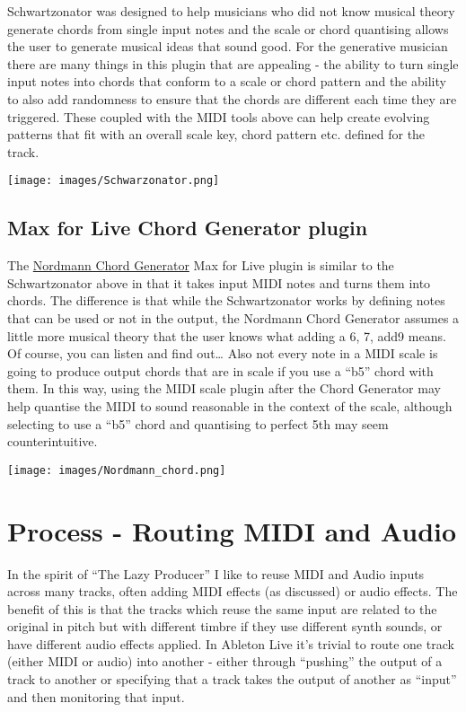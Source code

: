 \documentclass[
  12pt,
  letterpaper,
  oneside,
  open=any]{scrbook}
\begin{document}
Schwartzonator was designed to help musicians who did not know musical
theory generate chords from single input notes and the scale or chord
quantising allows the user to generate musical ideas that sound good.
For the generative musician there are many things in this plugin that
are appealing - the ability to turn single input notes into chords that
conform to a scale or chord pattern and the ability to also add
randomness to ensure that the chords are different each time they are
triggered. These coupled with the MIDI tools above can help create
evolving patterns that fit with an overall scale key, chord pattern etc.
defined for the track.

\texttt{[image: images/Schwarzonator.png]}

\section{Max for Live Chord Generator
plugin}\label{max-for-live-chord-generator-plugin}

The
\href{https://maxforlive.com/library/device/917/chord-generator}{Nordmann
Chord Generator} Max for Live plugin is similar to the Schwartzonator
above in that it takes input MIDI notes and turns them into chords. The
difference is that while the Schwartzonator works by defining notes that
can be used or not in the output, the Nordmann Chord Generator assumes a
little more musical theory that the user knows what adding a 6, 7, add9
means. Of course, you can listen and find out\ldots{} Also not every
note in a MIDI scale is going to produce output chords that are in scale
if you use a ``b5'' chord with them. In this way, using the MIDI scale
plugin after the Chord Generator may help quantise the MIDI to sound
reasonable in the context of the scale, although selecting to use a
``b5'' chord and quantising to perfect 5th may seem counterintuitive.

\texttt{[image: images/Nordmann\_chord.png]}


\chapter{Process - Routing MIDI and
Audio}\label{Chapter-005-Process-Routing}

In the spirit of ``The Lazy Producer'' I like to reuse MIDI and Audio
inputs across many tracks, often adding MIDI effects (as discussed) or
audio effects. The benefit of this is that the tracks which reuse the
same input are related to the original in pitch but with different
timbre if they use different synth sounds, or have different audio
effects applied. In Ableton Live it's trivial to route one track (either
MIDI or audio) into another - either through ``pushing'' the output of a
track to another or specifying that a track takes the output of another
as ``input'' and then monitoring that input.
\end{document}
